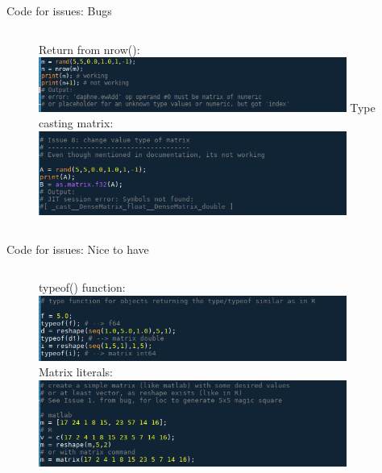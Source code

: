\documentclass[aspectratio=169]{beamer}
\begin{document}
\begin{frame}[c]{Code for issues: Bugs}
    \begin{figure}
        \begin{columns}[onlytextwidth,t]
            Return from nrow(): \\
            \includegraphics[width=0.9\textwidth]{images/I7.png}
            Type casting matrix: \\
            \includegraphics[width=0.9\textwidth]{images/I8.png}
        \end{columns}        
    \end{figure}          
\end{frame}

\begin{frame}[c]{Code for issues: Nice to have}
    \begin{figure}
        \begin{columns}[onlytextwidth,t]
            typeof() function: \\
            \includegraphics[width=0.9\textwidth]{images/I101.png}
            Matrix literals: \\
            \includegraphics[width=0.9\textwidth]{images/I102.png}
        \end{columns}        
    \end{figure}          
\end{frame}
\end{document}
